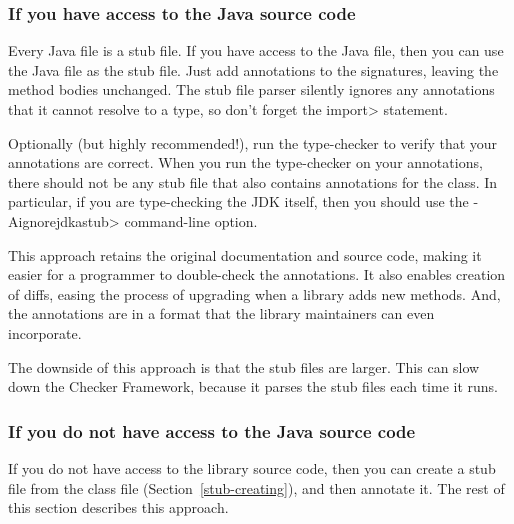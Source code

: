 \subsubsection{If you have access to the Java source code\label{stub-creating-with-source}}

Every Java file is a stub file.  If you have access to the Java file, then
you can use the Java file as the stub file.  Just add
annotations to the signatures, leaving the method bodies unchanged.
The stub file parser silently ignores any annotations that it cannot
resolve to a type, so don't forget the \<import> statement.

Optionally (but highly recommended!), run the type-checker to verify that
your annotations are correct.  When you run the type-checker on your
annotations, there should not be any stub file that also contains
annotations for the class.  In particular, if you are type-checking the JDK
itself, then you should use the \<-Aignorejdkastub> command-line option.

This approach retains the original
documentation and source code, making it easier for a programmer to
double-check the annotations.  It also enables creation of diffs, easing
the process of upgrading when a library adds new methods.  And, the
annotations are in a format that the library maintainers can even
incorporate.

The downside of this approach is that the stub files are larger.  This can
slow down the Checker Framework, because it parses the stub files each time
it runs.


\subsubsection{If you do not have access to the Java source code\label{stub-creating-without-source}}

If you do not have access to the library source code, then you can create a
stub file from the class file (Section~\ref{stub-creating}),
and then annotate it.  The rest of this section describes this approach.


